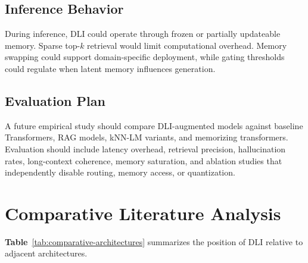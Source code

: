 \subsection{Inference Behavior}
During inference, DLI could operate through frozen or partially updateable memory. Sparse top-$k$ retrieval would limit computational overhead. Memory swapping could support domain-specific deployment, while gating thresholds could regulate when latent memory influences generation.

\subsection{Evaluation Plan}
A future empirical study should compare DLI-augmented models against baseline Transformers, RAG models, kNN-LM variants, and memorizing transformers. Evaluation should include latency overhead, retrieval precision, hallucination rates, long-context coherence, memory saturation, and ablation studies that independently disable routing, memory access, or quantization.


\clearpage

\section{Comparative Literature Analysis}

\vspace{-0.5\baselineskip}

\noindent
\textbf{Table}~\ref{tab:comparative-architectures}
summarizes the position of DLI relative to adjacent architectures.

\vspace{0.05in}

